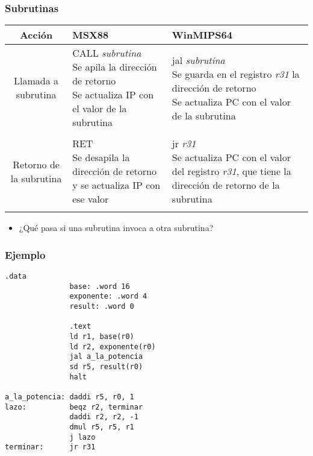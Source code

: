 \documentclass{beamer}
\begin{document}
\begin{frame}
\frametitle{Subrutinas}

\tiny{
\begin{tabular}{| c | p{3.5cm} | p{3.5cm} |}
\hline
Acción & MSX88 & WinMIPS64 \\ \hline
Llamada a subrutina &
\parbox{3.5cm}{CALL \emph{subrutina} \\ 
	Se apila la dirección de retorno \\ 
	Se actualiza IP con el valor de la subrutina } & 
\parbox{3.5cm}{jal \emph{subrutina} \\
Se guarda en el registro \emph{r31} la dirección de retorno \\
Se actualiza PC con el valor de la subrutina} 
\\ & & \\ \hline


Retorno de la subrutina &
\parbox{3.5cm}{RET \\ 
	Se desapila la dirección de retorno y se  actualiza IP con ese valor } & 
\parbox{3.5cm}{jr \emph{r31} \\
Se actualiza PC con el valor del registro \emph{r31}, que tiene la dirección de retorno de la subrutina} 
\\ & & \\ \hline
		
\end{tabular}	
}

\begin{itemize}
\item ¿Qué pasa si una subrutina invoca a otra subrutina?
\end{itemize}


\end{frame}


\begin{frame}[fragile]
\frametitle{Ejemplo}
\tiny{
\begin{block}{}
\begin{lstlisting}[language=WinMIPS64,basicstyle=\ttfamily,keywordstyle=\color{blue}]
               .data
               base: .word 16
               exponente: .word 4
               result: .word 0
			   
               .text
               ld r1, base(r0)
               ld r2, exponente(r0)
               jal a_la_potencia
               sd r5, result(r0)
               halt

a_la_potencia: daddi r5, r0, 1
lazo:          beqz r2, terminar
               daddi r2, r2, -1
               dmul r5, r5, r1
               j lazo
terminar:      jr r31
\end{lstlisting}
\end{block}
}
\end{frame}
\end{document}
